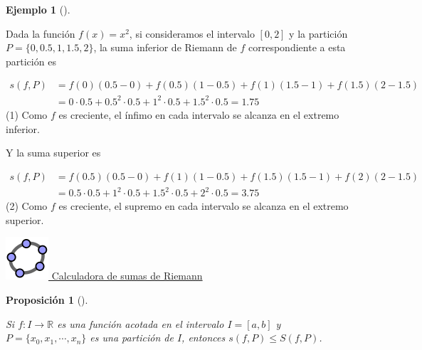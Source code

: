\documentclass[
  a4paper,
]{scrreport}
\theoremstyle{definition}
\newtheorem{example}{Ejemplo}[chapter]
\theoremstyle{plain}
\theoremstyle{definition}
\theoremstyle{definition}
\theoremstyle{plain}
\theoremstyle{plain}
\newtheorem{proposition}{Proposición}[chapter]
\theoremstyle{remark}
\begin{document}
\begin{example}[]\protect\hypertarget{exm-suma-inferior-superior-riemann}{}\label{exm-suma-inferior-superior-riemann}

Dada la función \(f(x)=x^2\), si consideramos el intervalo \([0,2]\) y
la partición \(P=\{0, 0.5, 1, 1.5, 2\}\), la suma inferior de Riemann de
\(f\) correspondiente a esta partición es

\begin{align*}
s(f,P) 
&= f(0)(0.5-0) + f(0.5) (1-0.5) + f(1) (1.5-1) + f(1.5) (2-1.5) \tag{1}\\
&= 0\cdot 0.5 + 0.5^2\cdot 0.5 + 1^2 \cdot 0.5 + 1.5^2 \cdot 0.5 
= 1.75
\end{align*} (1) Como \(f\) es creciente, el ínfimo en cada intervalo se
alcanza en el extremo inferior.

Y la suma superior es

\begin{align*}
s(f,P) 
&= f(0.5)(0.5-0) + f(1) (1-0.5) + f(1.5) (1.5-1) + f(2) (2-1.5) \tag{2}\\
&= 0.5\cdot 0.5 + 1^2\cdot 0.5 + 1.5^2 \cdot 0.5 + 2^2 \cdot 0.5 
= 3.75
\end{align*} (2) Como \(f\) es creciente, el supremo en cada intervalo
se alcanza en el extremo superior.

\end{example}

\href{https://www.geogebra.org/classic/nr6x8pjq}{\includegraphics{img/logos/logo-geogebra.png}
Calculadora de sumas de Riemann}

\begin{proposition}[]\protect\hypertarget{prp-sumas-riemann-inferior-superior}{}\label{prp-sumas-riemann-inferior-superior}

Si \(f:I\to\mathbb{R}\) es una función acotada en el intervalo
\(I=[a,b]\) y \(P=\{x_0, x_1, \cdots, x_n\}\) es una partición de \(I\),
entonces \(s(f,P)\leq S(f,P)\).

\end{proposition}
\end{document}
